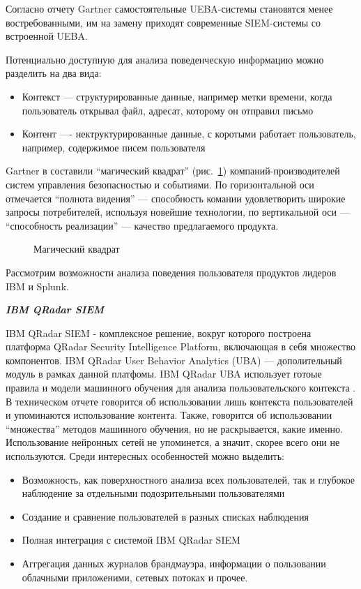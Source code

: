 Согласно отчету Gartner\cite{gartner} самостоятельные UEBA-системы становятся менее востребованными, им на замену приходят современные SIEM-системы со встроенной UEBA.

Потенциально доступную для анализа поведенческую информацию можно разделить на два вида:
\begin{itemize}
\item Контекст --- структурированные данные, например метки времени, когда пользователь открывал файл, адресат, которому он отправил письмо
\item Контент ---- нектруктурированные данные, с коротыми  работает пользователь, например, содержимое писем пользователя
\end{itemize}

Gartner в \cite{gartner2} составили ``магический квадрат'' (рис.~\ref{magic_quad}) компаний-производителей систем управления безопасностью и событиями. По горизонтальной оси отмечается ``полнота видения'' --- способность комании удовлетворить широкие запросы потребителей, используя новейшие технологии, по вертикальной оси --- ``способность реализации'' --- качество предлагаемого продукта.
\begin{figure}[h!]
\caption{Магический квадрат\cite{gartner2}}
\label{magic_quad}
\end{figure}

Рассмотрим возможности анализа поведения пользователя продуктов лидеров IBM и Splunk.

\textbf{\textit{IBM QRadar SIEM}}

IBM QRadar SIEM - комплексное решение, вокруг которого построена платформа QRadar Security Intelligence Platform, включающая в себя множество компонентов. IBM QRadar User Behavior Analytics (UBA)\cite{ibm_uba} --- дополительный модуль в рамках данной платфомы. IBM QRadar UBA использует готоые правила и модели машинного обучения для анализа пользовательского контекста\cite{ibm_uba} . В техническом отчете\cite{ibm_tech} говорится об использовании лишь контекста пользователей и упоминаются использование контента. Также, говорится об использовании ``множества'' методов машинного обучения, но не раскрывается, какие именно. Использование нейронных сетей не упоминется, а значит, скорее всего они не используются. Среди интересных особенностей можно выделить:
\begin{itemize}
\item Возможность, как поверхностного анализа всех пользователей, так и глубокое наблюдение за отдельными подозрительными пользователями
\item Создание и сравнение пользователей в разных списках наблюдения
\item Полная интеграция с системой IBM QRadar SIEM
\item Аггрегация данных журналов брандмауэра, информации о пользовании облачными приложеними, сетевых потоках и прочее.
\end{itemize}

